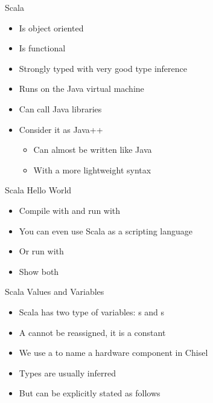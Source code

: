 \begin{frame}[fragile]{Scala}
\begin{itemize}
\item Is object oriented
\item Is functional
\item Strongly typed with very good type inference
\item Runs on the Java virtual machine
\item Can call Java libraries
\item Consider it as Java++
\begin{itemize}
\item Can almost be written like Java
\item With a more lightweight syntax
\end{itemize}
\end{itemize}
\end{frame}

\begin{frame}[fragile]{Scala Hello World}
\begin{itemize}
\item Compile with  and run with 
\item You can even use Scala as a scripting language
\item Or run with 
\item Show both
\end{itemize}
\end{frame}

\begin{frame}[fragile]{Scala Values and Variables}
\begin{itemize}
\item Scala has two type of variables: s and s
\item A  cannot be reassigned, it is a constant
\item We use a  to name a hardware component in Chisel
\end{itemize}
\begin{itemize}
\item Types are usually inferred
\item But can be explicitly stated as follows
\end{itemize}
\end{frame}

